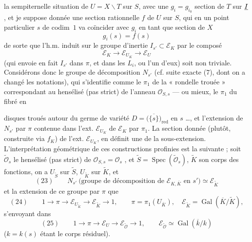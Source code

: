 \documentclass[11pt,a4paper]{article}
\begin{document}
la sempiternelle situation de $U = X \smallsetminus T$ sur $S$, avec une
$g_i = g_{i_0}$ section de $T$ sur $\uncertain{I}$, et je suppose donnée une
section rationnelle  $f$ de $U$ sur $S$, qui en un point
particulier $s$ de \struck{\ill{}} codim~$1$ va coïncider avec 
$g_i$ en tant que section de $X$
\[
  g_i(s) = f(s)
\]
de sorte que l'h.m. induit sur le groupe d'inertie $I_{s'} \subset \mathcal{E}_K$
par le composé
\[
  \mathcal{E}_K \longrightarrow \mathcal{E}_{U_K} \longrightarrow \mathcal{E}_U
\]
(qui envoie en fait $I_{s'}$ dans $\pi$, et  dans les $L_i$, ou
l'un d'eux) soit non  triviale. Considérons donc le groupe de
décomposition $N_{s'}$ (cf. suite exacte (7), dont on a changé les notations),
qui s'identifie comme le $\pi_1$ de la « rondelle trouée » correspondant au
hensélisé (pas strict) de l'anneau $\mathcal{O}_{S,s}$ — ou mieux, le $\pi_1$
du fibré en


disques troués autour du germe de variété
$D = \bigl(\overline{\{s\}}\bigr)_{\mathrm{red}}$ en $s$ …, et l'extension
de $N_{s'}$ par $\pi$ contenue dans l'ext. $\mathcal{E}_{U_K}$ de
$\mathcal{E}_K$ par $\pi_1$. La section donnée (plutôt, construite via $f_K$)
de l'ext. $\mathcal{E}_{U_K}$, en définit une de la sous-extension.
L'interprétation géométrique de ces constructions profinies est la suivante ;
soit \struck{\ill{}} $\tilde{\mathcal{O}}_s$ le hensélisé (pas strict) de
$\mathcal{O}_{S,s} = \mathcal{O}_s$ , et
$\tilde{S} = \operatorname{Spec}(\tilde{\mathcal{O}}_s)$, $\tilde{K}$ son corps
des fonctions, on a $U_{\tilde{S}}$ sur $\tilde{S}$, $U_{\tilde{K}}$ sur
$\tilde{K}$, et 
\[
  (23)\qquad N_{s'} \ \text{(groupe de décomposition de $\mathcal{E}_{K,\overline{K}}$ en $s'$)} \simeq \mathcal{E}_{\tilde{K}}
\]
et la   extension de ce groupe par $\pi$
 que
\[
  (24)\qquad 1 \to \pi \to \mathcal{E}_{U_{\tilde{K}}} \to \mathcal{E}_{\tilde{K}} \to 1 ,
  \qquad \pi = \pi_1(U_{\overline{K}}), \quad \mathcal{E}_{\tilde{K}} = \operatorname{Gal}(\overline{K}/\tilde{K}),
\]
s'envoyant dans
\[
  (25)\qquad 1 \to \pi \to \mathcal{E}_{U} \to \mathcal{E}_{\tilde{\mathcal{O}}} \to 1 ,
  \qquad \mathcal{E}_{\tilde{\mathcal{O}}} \simeq \operatorname{Gal}(\overline{k}/k)
\]
($k = k(s)$ étant le corps résiduel).
\end{document}
